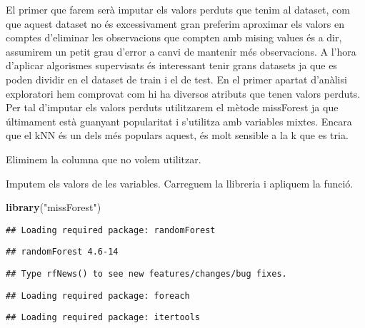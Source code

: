 \documentclass[]{article}
\newenvironment{Shaded}{\begin{snugshade}}{\end{snugshade}}
\newcommand{\CommentTok}[1]{\textcolor[rgb]{0.56,0.35,0.01}{\textit{#1}}}
\newcommand{\KeywordTok}[1]{\textcolor[rgb]{0.13,0.29,0.53}{\textbf{#1}}}
\newcommand{\NormalTok}[1]{#1}
\newcommand{\StringTok}[1]{\textcolor[rgb]{0.31,0.60,0.02}{#1}}
\begin{document}
El primer que farem serà imputar els valors perduts que tenim al
dataset, com que aquest dataset no és excessivament gran preferim
aproximar els valors en comptes d'eliminar les observacions que compten
amb mising values és a dir, assumirem un petit grau d'error a canvi de
mantenir més observacions. A l'hora d'aplicar algorismes supervisats és
interessant tenir grans datasets ja que es poden dividir en el dataset
de train i el de test. En el primer apartat d'anàlisi exploratori hem
comprovat com hi ha diversos atributs que tenen valors perduts. Per tal
d'imputar els valors perduts utilitzarem el mètode missForest ja que
últimament està guanyant popularitat i s'utilitza amb variables mixtes.
Encara que el kNN és un dels més populars aquest, és molt sensible a la
k que es tria.

Eliminem la columna que no volem utilitzar.

\begin{Shaded}
\end{Shaded}

Imputem els valors de les variables. Carreguem la llibreria i apliquem
la funció.

\begin{Shaded}
\begin{Highlighting}[]
\KeywordTok{library}\NormalTok{(}\StringTok{"missForest"}\NormalTok{)}
\end{Highlighting}
\end{Shaded}

\begin{verbatim}
## Loading required package: randomForest
\end{verbatim}

\begin{verbatim}
## randomForest 4.6-14
\end{verbatim}

\begin{verbatim}
## Type rfNews() to see new features/changes/bug fixes.
\end{verbatim}

\begin{verbatim}
## Loading required package: foreach
\end{verbatim}

\begin{verbatim}
## Loading required package: itertools
\end{verbatim}
\end{document}

